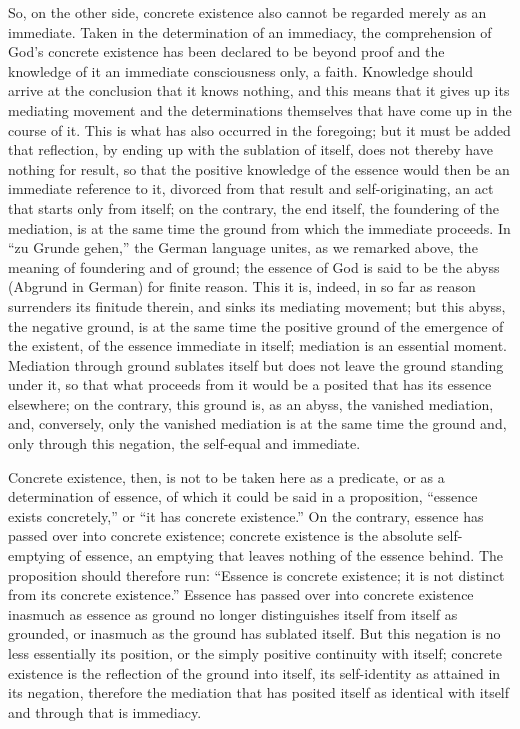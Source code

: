 So, on the other side, concrete existence also
cannot be regarded merely as an immediate.
Taken in the determination of an immediacy,
the comprehension of God's concrete existence
has been declared to be beyond proof
and the knowledge of it an immediate consciousness only, a faith.
Knowledge should arrive at the conclusion that it knows nothing,
and this means that it gives up its mediating movement
and the determinations themselves
that have come up in the course of it.
This is what has also occurred in the foregoing;
but it must be added that reflection,
by ending up with the sublation of itself,
does not thereby have nothing for result,
so that the positive knowledge of the essence
would then be an immediate reference to it,
divorced from that result and self-originating,
an act that starts only from itself;
on the contrary, the end itself, the foundering of the mediation,
is at the same time the ground from which the immediate proceeds.
In “zu Grunde gehen,” the German language unites, as we remarked above,
the meaning of foundering and of ground;
the essence of God is said to be the
abyss (Abgrund in German) for finite reason.
This it is, indeed, in so far as
reason surrenders its finitude therein,
and sinks its mediating movement;
but this abyss, the negative ground, is at the same time
the positive ground of the emergence of the existent,
of the essence immediate in itself;
mediation is an essential moment.
Mediation through ground sublates itself but
does not leave the ground standing under it,
so that what proceeds from it would be a posited
that has its essence elsewhere;
on the contrary, this ground is, as an abyss,
the vanished mediation, and, conversely, only the
vanished mediation is at the same time the ground
and, only through this negation,
the self-equal and immediate.

Concrete existence, then, is not to be taken here
as a predicate, or as a determination of essence,
of which it could be said in a proposition,
“essence exists concretely,” or “it has concrete existence.”
On the contrary, essence has passed over into concrete existence;
concrete existence is the absolute self-emptying of essence,
an emptying that leaves nothing of the essence behind.
The proposition should therefore run:
“Essence is concrete existence;
it is not distinct from its concrete existence.”
Essence has passed over into concrete existence inasmuch as
essence as ground no longer distinguishes itself from itself as grounded,
or inasmuch as the ground has sublated itself.
But this negation is no less essentially its position,
or the simply positive continuity with itself;
concrete existence is the reflection of the ground into itself,
its self-identity as attained in its negation,
therefore the mediation that has posited itself
as identical with itself and through that is immediacy.

